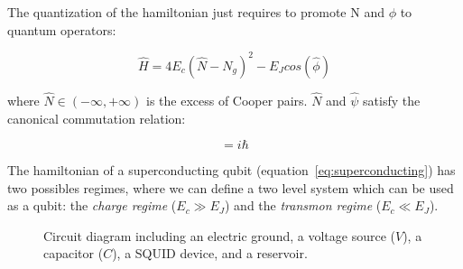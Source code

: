 The quantization of the hamiltonian just requires to promote N and $\phi$ to quantum operators:

\begin{equation}
    \hat{H} = 4 E_c (\hat{N} - N_g)^2 - E_J cos(\hat{\phi})
\label{eq:superconducting}
\end{equation}

where $\hat{N} \in (- \infty, + \infty)$ is the excess of Cooper pairs.
$\hat{N}$ and $\hat{\psi}$ satisfy the canonical commutation relation:

\begin{equation}
    [\hat{\phi}, \hat{N}] = i \hbar
\end{equation}

The hamiltonian of a superconducting qubit (equation~\ref{eq:superconducting}) has two possibles
regimes, where we can define a two level system which can be used as a qubit: the \textit{charge regime} ($E_c \gg E_J$) and 
the \textit{transmon regime} ($E_c \ll E_J$). 

\begin{figure}[ht]
    \centering
    \caption{Circuit diagram including an electric ground, a voltage source ($V$), a capacitor ($C$), a SQUID device, and a reservoir.}
    \label{fig:circuit}

\end{figure}








